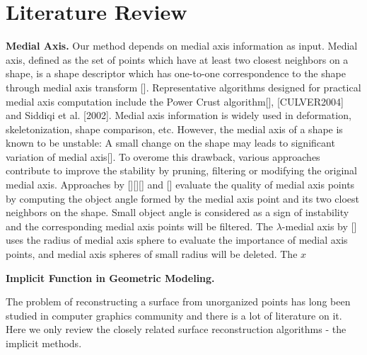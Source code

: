 \documentclass[annual]{acmsiggraph}
\begin{document}
\section{Literature Review}



\textbf{Medial Axis. }
Our method depends on medial axis information as input. Medial axis, defined as the set of points which have at least two closest neighbors on a shape, is a shape descriptor which has one-to-one correspondence to the shape through medial axis transform []. Representative algorithms designed for practical medial axis computation include the Power Crust algorithm[], [CULVER2004] and  Siddiqi et al. [2002]. Medial axis information is widely used in deformation, skeletonization, shape comparison, etc. However, the medial axis of a shape is known to be unstable: A small change on the shape may leads to significant variation of medial axis[]. To overome this drawback, various approaches contribute to improve the stability by pruning, filtering or modifying the original medial axis. Approaches by [][][] and [] evaluate the quality of medial axis points by computing the object angle formed by the medial axis point and its two cloest neighbors on the shape. Small object angle is considered as a sign of instability and the corresponding medial axis points will be filtered. The $\lambda$-medial axis by [] uses the radius of medial axis sphere to evaluate the importance of medial axis points, and medial axis spheres of small radius will be deleted. The $x$

\textbf{Implicit Function in Geometric Modeling. }

The problem of reconstructing a surface from unorganized points has long been studied in
computer graphics community and there is a lot of literature on it. Here we only review 
the closely related surface reconstruction algorithms - the implicit methods. 
\end{document}
